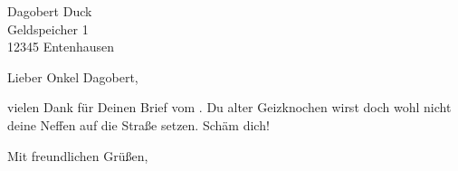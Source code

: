 \documentclass[ngerman,12pt]{scrlttr2}
\begin{document}
\begin{letter}{Dagobert Duck \\ Geldspeicher 1 \\ 12345 Entenhausen}
\opening{Lieber Onkel Dagobert,}

\begin{RaggedRight}
vielen Dank für Deinen Brief vom . Du alter Geizknochen wirst doch wohl nicht deine Neffen auf die Straße setzen. Schäm dich! 

\blindtext[4]
\end{RaggedRight}

\closing{Mit freundlichen Grüßen,}

\end{letter}
\end{document}
